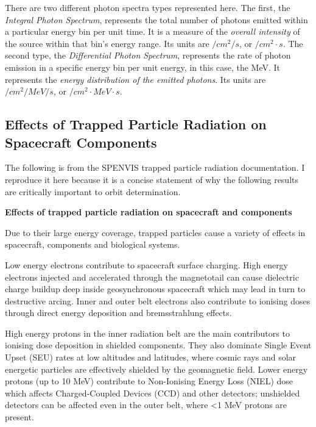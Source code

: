 \documentclass[11pt]{article}
\begin{document}
There are two different photon spectra types represented here. The first, the \textit{Integral Photon Spectrum}, represents the total number of photons emitted within a particular energy bin per unit time. It is a measure of the \textit{overall intensity} of the source within that bin's energy range. Its units are $\unit{/cm^2/s}$, or $\unit{/cm^2\cdot s}$. The second type, the \textit{Differential Photon Spectrum}, represents the rate of photon emission in a specific energy bin per unit energy, in this case, the MeV. It represents the \textit{energy distribution of the emitted photons}. Its units are $\unit{/cm^2/MeV/s}$, or $\unit{/cm^2\cdot MeV\cdot s}$. 

\subsection{Effects of Trapped Particle Radiation on Spacecraft Components}

The following is from the SPENVIS trapped particle radiation documentation. I reproduce it here because it is a concise statement of why the following results are critically important to orbit determination.\cite{website:spenvis01}

\begin{displayquote}
    \textbf{Effects of trapped particle radiation on spacecraft and components}

    Due to their large energy coverage, trapped particles cause a variety of effects in spacecraft, components and biological systems.
    
    Low energy electrons contribute to spacecraft surface charging. High energy electrons injected and accelerated through the magnetotail can cause dielectric charge buildup deep inside geosynchronous spacecraft which may lead in turn to destructive arcing. Inner and outer belt electrons also contribute to ionising doses through direct energy deposition and bremsstrahlung effects.

    High energy protons in the inner radiation belt are the main contributors to ionising dose deposition in shielded components. They also dominate Single Event Upset (SEU) rates at low altitudes and latitudes, where cosmic rays and solar energetic particles are effectively shielded by the geomagnetic field. Lower energy protons (up to 10 MeV) contribute to Non-Ionising Energy Loss (NIEL) dose which affects Charged-Coupled Devices (CCD) and other detectors; unshielded detectors can be affected even in the outer belt, where <1 MeV protons are present.
    
\end{displayquote}
\end{document}
